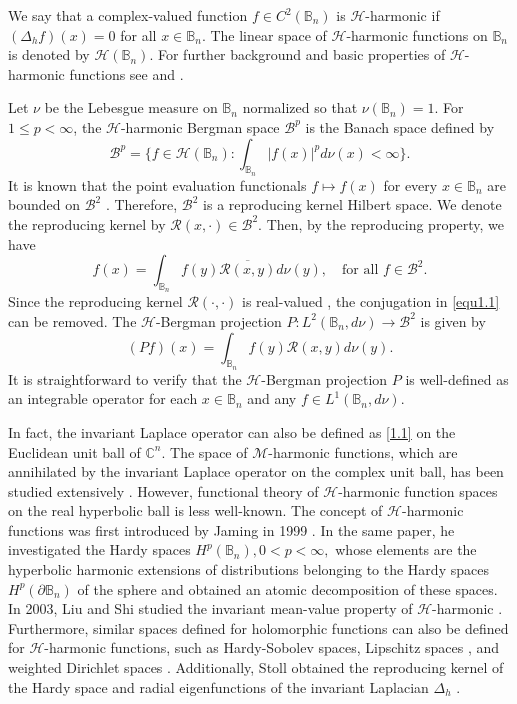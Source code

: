 \documentclass[12pt]{amsart}
\theoremstyle{definition}
\theoremstyle{remark}
\newcommand{\C}{\mathbb{C}}
\newcommand{\B}{\mathbb{B}}
\begin{document}
We say that a complex-valued function $f\in C^2(\B_n)$ is $\mathcal{H}$-harmonic if $(\Delta_hf)(x)=0$ for all $x\in\B_n$. The linear space of $\mathcal{H}$-harmonic functions on $\B_n$ is denoted by $\mathcal{H}(\B_n)$. For further background and basic properties of $\mathcal{H}$-harmonic functions see \cite{Ureyen2023} and \cite{Stoll}.

Let $\nu$ be the Lebesgue measure on $\B_n$ normalized so that $\nu(\B_n)=1.$ 
For $1\leqslant p<\infty$, the $\mathcal{H}$-harmonic Bergman space $\mathcal{B}^p $ is the Banach space defined by
\[\mathcal{B}^p =\bigg\{f\in\mathcal{H}(\B_n):\int_{\B_n}|f(x)|^pd\nu (x)<\infty\bigg\}.\]
It is known that the point evaluation functionals $f\mapsto f(x)$ for every $x\in\B_n$ are bounded on $\mathcal{B}^2 $ \cite{Ureyen2023}. Therefore, $\mathcal{B}^2 $ is a reproducing kernel Hilbert space. We denote the reproducing kernel by $\mathcal{R} (x,\cdot)\in\mathcal{B}^2 $. Then, by the reproducing property, we have
\begin{equation}\label{equ1.1}
	f(x)=\int_{\B_n} f(y) \overline{\mathcal{R} (x,y)}d\nu (y),\quad\text{for all } f\in\mathcal{B}^2 .
\end{equation}
Since the reproducing kernel $\mathcal{R} (\cdot,\cdot)$ is real-valued \cite{Ureyen2023}, the conjugation in \eqref{equ1.1} can be removed. The $\mathcal{H}$-Bergman projection $P : L^2(\B_n,d\nu)\to \mathcal{B}^2 $ is given by
\[
(P  f)(x)=\int_{\B_n}f(y) \mathcal{R} (x,y)d\nu (y).
\]
It is straightforward to verify that the $\mathcal{H}$-Bergman projection $P$ is well-defined as an integrable operator for each $x\in\B_n$ and any $f\in L^1(\B_n,d\nu)$.

In fact, the invariant Laplace operator can also be defined as \eqref{1.1} on the Euclidean unit ball of $\C^n$. The space of $\mathcal{M}$-harmonic functions, which are annihilated by the invariant Laplace operator on the complex unit ball, has been studied extensively \cite{ ABC1996, Englis2024,Rudin, Stoll1}. 
However, functional theory of $\mathcal{H}$-harmonic function spaces on the real hyperbolic ball is less well-known. 
The concept of $\mathcal{H}$-harmonic functions was first introduced by Jaming in 1999 \cite{Jaming1999}. 
In the same paper, he investigated the Hardy spaces $H^p(\B_n),0<p<\infty,$ whose elements are the hyperbolic harmonic extensions of distributions belonging to the Hardy spaces $H^p(\partial \B_n)$ of the sphere and obtained an atomic decomposition of these spaces. 
In 2003, Liu and Shi studied the invariant mean-value property of $\mathcal{H}$-harmonic \cite{LiuShi2003}. 
Furthermore, similar spaces defined for holomorphic functions can also be defined for $\mathcal{H}$-harmonic functions, such as Hardy-Sobolev spaces, Lipschitz spaces \cite{Jaming2004}, and weighted Dirichlet spaces \cite{Stoll2012}. 
Additionally, Stoll obtained the reproducing kernel of the Hardy space and radial eigenfunctions of the invariant Laplacian $\Delta_h$ \cite{Stoll2019}.
\end{document}
